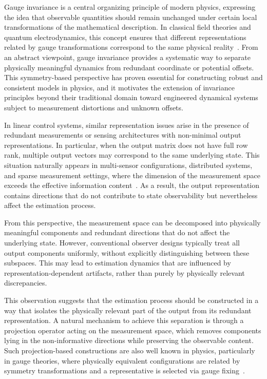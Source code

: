\documentclass[11pt]{article}
\begin{document}
Gauge invariance is a central organizing principle of modern physics, expressing the idea that observable quantities should remain unchanged under certain local transformations of the mathematical description. In classical field theories and quantum electrodynamics, this concept ensures that different representations related by gauge transformations correspond to the same physical reality~\cite{Peskin1995, YangMills1954}. From an abstract viewpoint, gauge invariance provides a systematic way to separate physically meaningful dynamics from redundant coordinate or potential offsets. This symmetry-based perspective has proven essential for constructing robust and consistent models in physics, and it motivates the extension of invariance principles beyond their traditional domain toward engineered dynamical systems subject to measurement distortions and unknown offsets.

In linear control systems, similar representation issues arise in the presence of redundant measurements or sensing architectures with non-minimal output representations. In particular, when the output matrix does not have full row rank, multiple output vectors may correspond to the same underlying state. This situation naturally appears in multi-sensor configurations, distributed systems, and sparse measurement settings, where the dimension of the measurement space exceeds the effective information content~\cite{Chen1999, Kailath1980}. As a result, the output representation contains directions that do not contribute to state observability but nevertheless affect the estimation process.

From this perspective, the measurement space can be decomposed into physically meaningful components and redundant directions that do not affect the underlying state. However, conventional observer designs typically treat all output components uniformly, without explicitly distinguishing between these subspaces. This may lead to estimation dynamics that are influenced by representation-dependent artifacts, rather than purely by physically relevant discrepancies.

This observation suggests that the estimation process should be constructed in a way that isolates the physically relevant part of the output from its redundant representation. A natural mechanism to achieve this separation is through a projection operator acting on the measurement space, which removes components lying in the non-informative directions while preserving the observable content. Such projection-based constructions are also well known in physics, particularly in gauge theories, where physically equivalent configurations are related by symmetry transformations and a representative is selected via gauge fixing~\cite{Peskin1995}.
\end{document}
